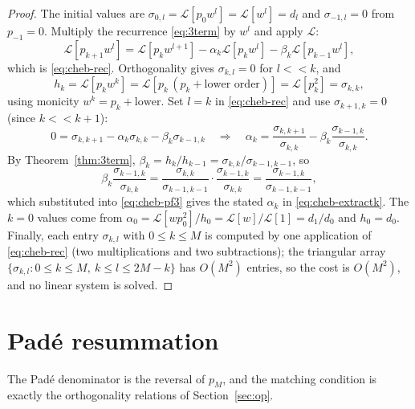 \documentclass[11pt]{article}
\newcommand{\Lc}{\mathcal{L}}
\begin{document}
\begin{proof}
The initial values are $\sigma_{0,l}=\Lc[p_0w^l]=\Lc[w^l]=d_l$ and
$\sigma_{-1,l}=0$ from $p_{-1}=0$. Multiply the recurrence
\eqref{eq:3term} by $w^l$ and apply $\Lc$:
\begin{equation}\label{eq:cheb-pf1}
\Lc[p_{k+1}w^l]=\Lc[p_k w^{l+1}]-\alpha_k\Lc[p_k w^l]
-\beta_k\Lc[p_{k-1}w^l],
\end{equation}
which is \eqref{eq:cheb-rec}. Orthogonality gives $\sigma_{k,l}=0$ for
$l<<k$, and
\begin{equation}\label{eq:cheb-pf2}
h_k=\Lc[p_k w^k]=\Lc[p_k\,(p_k+\text{lower order})]=\Lc[p_k^2]=\sigma_{k,k},
\end{equation}
using monicity $w^k=p_k+\text{lower}$. Set $l=k$ in \eqref{eq:cheb-rec} and
use $\sigma_{k+1,k}=0$ (since $k<<k+1$):
\begin{equation}\label{eq:cheb-pf3}
0=\sigma_{k,k+1}-\alpha_k\sigma_{k,k}-\beta_k\sigma_{k-1,k}
\quad\Longrightarrow\quad
\alpha_k=\frac{\sigma_{k,k+1}}{\sigma_{k,k}}
-\beta_k\frac{\sigma_{k-1,k}}{\sigma_{k,k}} .
\end{equation}
By Theorem~\ref{thm:3term}, $\beta_k=h_k/h_{k-1}=\sigma_{k,k}/
\sigma_{k-1,k-1}$, so
\begin{equation}\label{eq:cheb-pf4}
\beta_k\frac{\sigma_{k-1,k}}{\sigma_{k,k}}
=\frac{\sigma_{k,k}}{\sigma_{k-1,k-1}}\cdot\frac{\sigma_{k-1,k}}{\sigma_{k,k}}
=\frac{\sigma_{k-1,k}}{\sigma_{k-1,k-1}},
\end{equation}
which substituted into \eqref{eq:cheb-pf3} gives the stated $\alpha_k$ in
\eqref{eq:cheb-extractk}. The $k=0$ values come from $\alpha_0=\Lc[wp_0^2]/
h_0=\Lc[w]/\Lc[1]=d_1/d_0$ and $h_0=d_0$. Finally, each entry
$\sigma_{k,l}$ with $0\le k\le M$ is computed by one application of
\eqref{eq:cheb-rec} (two multiplications and two subtractions); the
triangular array $\{\sigma_{k,l}:0\le k\le M,\ k\le l\le 2M-k\}$ has
$O(M^2)$ entries, so the cost is $O(M^2)$, and no linear system is solved.
\end{proof}

\section{Pad\'e resummation}\label{sec:pade}

The Pad\'e denominator is the reversal of $p_M$, and the matching condition
is exactly the orthogonality relations of Section~\ref{sec:op}.
\end{document}
